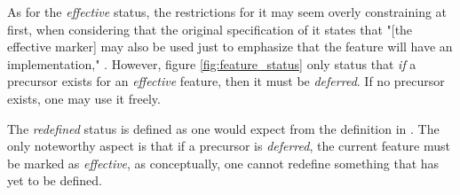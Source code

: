 As for the \textit{effective} status, the restrictions for it may seem overly constraining at first, when considering that the original specification of it states that "[the effective marker] may also be used just to emphasize that the feature will have an implementation," \cite[p.~40]{walden1995}. However, figure \ref{fig:feature_status} only status that \emph{if} a precursor exists for an \textit{effective} feature, then it must be \textit{deferred}. If no precursor exists, one may use it freely.

The \textit{redefined} status is defined as one would expect from the definition in \cite[p.~40]{walden1995}. The only noteworthy aspect is that if a precursor is \textit{deferred}, the current feature must be marked as \textit{effective}, as conceptually, one cannot redefine something that has yet to be defined.

